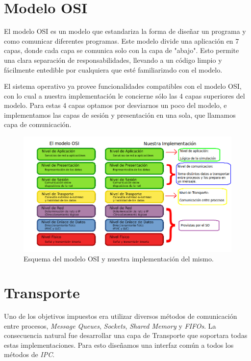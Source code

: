 \documentclass[a4paper,10pt]{article}
\begin{document}
\newpage
\section{Modelo OSI}

El modelo OSI es un modelo que estandariza la forma de diseñar un programa y como comunicar diferentes programas. 
Este modelo divide una aplicación en 7 capas, donde cada capa se comunica solo con la capa de "abajo".
Esto permite una clara separación de responsabilidades, llevando a un código limpio y fácilmente entedible por cualquiera que esté familiarizado con el modelo.

El sistema operativo ya provee funcionalidades compatibles con el modelo OSI, con lo cual a nuestra implementación le concierne sólo las 4 capas superiores del modelo.
Para estas 4 capas optamos por desviarnos un poco del modelo, e implementamos las capas de sesión y presentación en una sola, que llamamos capa de comunicación.

\begin{figure}[H]
\begin{center}
 \includegraphics[scale=0.5]{./images/modelo-osi_nuestro.png}
 \caption{Esquema del modelo OSI y nuestra implementación del mismo.}
\end{center}
\end{figure}


\newpage
\section{Transporte}
Uno de los objetivos impuestos era utilizar diversos métodos de comunicación entre procesos, \textit{Message Queues}, \textit{Sockets}, \textit{Shared Memory} y
\textit{FIFOs}.
La consecuencia natural fue desarrollar una capa de Transporte que soportara todas estas implementaciones.
Para esto diseñamos una interfaz común a todos los métodos de \textit{IPC}.
\end{document}
